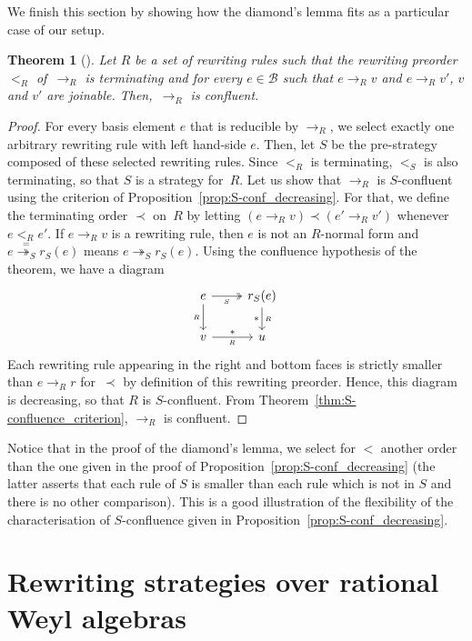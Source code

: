 \documentclass[11pt]{article}
\newtheorem{theorem}{Theorem}[section]
\theoremstyle{definition}
\newcommand\basis{\mathscr{B}}
\newcommand\ordS{<_S}
\newcommand\rewR{\to_R}
\newcommand\parS{\twoheadrightarrow_S}
\begin{document}
We finish this section by showing how the diamond's lemma fits as a
particular case of our setup.
\medskip

\begin{theorem}[\cite{MR506890}]\label{thm:diamond_lemma}
  Let $R$ be a set of rewriting rules such that the rewriting preorder
  $<_R$ of~$\rewR$ is terminating and for every $e\in\basis$ such that
  $e\rewR v$ and $e\rewR v'$, $v$ and $v'$ are joinable. Then,~$\rewR$ is
  confluent.
\end{theorem}

\begin{proof}
  For every basis element $e$ that is reducible by $\rewR$, we select
  exactly one arbitrary rewriting rule with left hand-side
  $e$. Then, let $S$ be the pre-strategy composed of these selected
  rewriting rules. Since $<_R$ is terminating, $\ordS$ is also
  terminating, so that $S$ is a strategy for~$R$. Let us show that
  $\rewR$ is $S$-confluent using the criterion of
  Proposition~\ref{prop:S-conf_decreasing}. For that, we define the
  terminating order $\prec$ on~$R$ by letting
  $(e\rewR v)\prec(e'\rewR v')$  whenever $e<_Re'$. If $e\rewR v$ is a
  rewriting rule, then $e$ is not an $R$-normal form and
  $e\overset{=}{\parS}r_S(e)$ means $e\parS r_S(e)$. Using the confluence
  hypothesis of the theorem, we have a diagram
  \[\begin{tikzcd}
  e\ar[d, "_R"']\ar[r, twoheadrightarrow, "_S"'] &
  r_S(e)\ar[d, rightarrow, "*"', "_R"]\\
  v\ar[r, rightarrow, "*", "_R"'] & u
  \end{tikzcd}\]
  Each rewriting rule appearing in the right and bottom faces is strictly
  smaller than $e\rewR r$ for~$\prec$ by definition of this rewriting
  preorder. Hence, this diagram is decreasing, so that $R$ is
  $S$-confluent. From Theorem~\ref{thm:S-confluence_criterion}, $\rewR$
  is confluent.   
\end{proof}
\smallskip

Notice that in the proof of the diamond's lemma, we select for $<$
another order than the one given in the proof of
Proposition~\ref{prop:S-conf_decreasing} (the latter asserts that each
rule of $S$ is smaller than each rule which is not in $S$ and there is no
other comparison). This is a good illustration of the flexibility of the
characterisation of $S$-confluence given in
Proposition~\ref{prop:S-conf_decreasing}. 

\section{Rewriting strategies over rational Weyl algebras}
\label{sec:rewriting_strategies_over_rational_Weyl_algebras}
\end{document}
